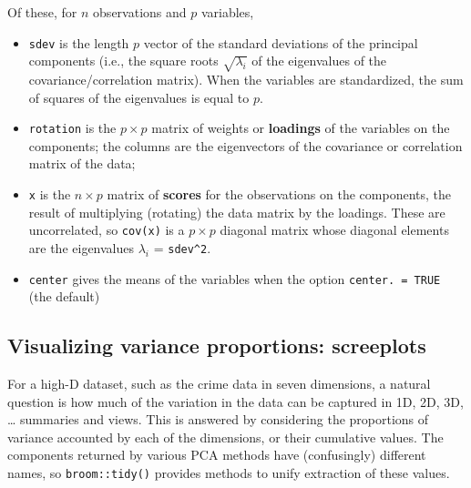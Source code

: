 \documentclass[
  letterpaper,
  10pt,
  krantz2]{krantz}
\providecommand{\tightlist}{%
  \setlength{\itemsep}{0pt}\setlength{\parskip}{0pt}}\usepackage{longtable,booktabs,array}
\begin{document}
Of these, for \(n\) observations and \(p\) variables,

\begin{itemize}
\tightlist
\item
  \texttt{sdev} is the length \(p\) vector of the standard deviations of
  the principal components (i.e., the square roots \(\sqrt{\lambda_i}\)
  of the eigenvalues of the covariance/correlation matrix). When the
  variables are standardized, the sum of squares of the eigenvalues is
  equal to \(p\).
\item
  \texttt{rotation} is the \(p \times p\) matrix of weights or
  \textbf{loadings} of the variables on the components; the columns are
  the eigenvectors of the covariance or correlation matrix of the data;
\item
  \texttt{x} is the \(n \times p\) matrix of \textbf{scores} for the
  observations on the components, the result of multiplying (rotating)
  the data matrix by the loadings. These are uncorrelated, so
  \texttt{cov(x)} is a \(p \times p\) diagonal matrix whose diagonal
  elements are the eigenvalues \(\lambda_i\) = \texttt{sdev\^{}2}.
\item
  \texttt{center} gives the means of the variables when the option
  \texttt{center.\ =\ TRUE} (the default)
\end{itemize}

\subsection{Visualizing variance proportions:
screeplots}\label{visualizing-variance-proportions-screeplots}

For a high-D dataset, such as the crime data in seven dimensions, a
natural question is how much of the variation in the data can be
captured in 1D, 2D, 3D, \ldots{} summaries and views. This is answered
by considering the proportions of variance accounted by each of the
dimensions, or their cumulative values. The components returned by
various PCA methods have (confusingly) different names, so
\texttt{broom::tidy()} provides methods to unify extraction of these
values.
\end{document}
